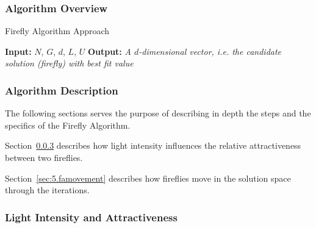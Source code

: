 \subsubsection{Algorithm Overview}

\begin{algorithm}
	\caption{Firefly Algorithm Approach} \label{alg:fa}
	\begin{algorithmic}
		\newline
		\textbf{Input:} $N$, $G$, $d$, $L$, $U$ \newline
		\textbf{Output:} \textit{A $d$-dimensional vector,
			i.e. the candidate solution (firefly) with best fit value}
						\EndIf
				\EndFor
			\EndFor
		\EndWhile
		\EndProcedure
	\end{algorithmic}
\end{algorithm}

\subsubsection{Algorithm Description}

The following sections serves the purpose of describing in depth the steps
and the specifics of the Firefly Algorithm.

Section~\ref{sec:5.light_attract} describes how light intensity influences
the relative attractiveness between two fireflies. 

Section~\ref{sec:5.famovement} describes how fireflies move in the solution
space through the iterations.

\subsubsection{Light Intensity and Attractiveness}
\label{sec:5.light_attract}

